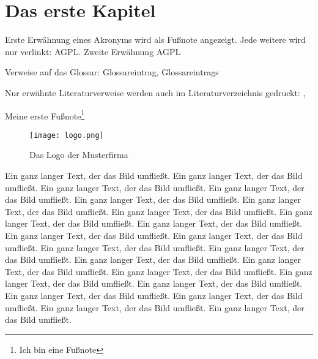 \chapter{Das erste Kapitel}
Erste Erwähnung eines Akronyms wird als Fußnote angezeigt. Jede weitere wird
nur verlinkt: \ac{AGPL}. Zweite Erwähnung \ac{AGPL}

Verweise auf das Glossar: \gls{Glossareintrag}, \glspl{Glossareintrag}

Nur erwähnte Literaturverweise werden auch im Literaturverzeichnis gedruckt:
\cite{baumgartner:2002}, \cite{dreyfus:1980}

Meine erste Fußnote\footnote{Ich bin eine Fußnote}

\begin{wrapfigure}{r}{.4\textwidth}
\texttt{[image: logo.png]}
\vspace{-15pt}
\caption{Das Logo der Musterfirma\footnotemark}
\end{wrapfigure}
Ein ganz langer Text, der das Bild umfließt. Ein ganz langer Text, der das Bild
umfließt. Ein ganz langer Text, der das Bild umfließt. Ein ganz langer Text, der
das Bild umfließt. Ein ganz langer Text, der das Bild umfließt. Ein ganz langer
Text, der das Bild umfließt. Ein ganz langer Text, der das Bild umfließt. Ein
ganz langer Text, der das Bild umfließt. Ein ganz langer Text, der das Bild
umfließt. Ein ganz langer Text, der das Bild umfließt. Ein ganz langer Text, der
das Bild umfließt. Ein ganz langer Text, der das Bild umfließt. Ein ganz langer Text, der das Bild
umfließt. Ein ganz langer Text, der das Bild umfließt. Ein ganz langer Text, der
das Bild umfließt. Ein ganz langer Text, der das Bild umfließt. Ein ganz langer
Text, der das Bild umfließt. Ein ganz langer Text, der das Bild umfließt. Ein
ganz langer Text, der das Bild umfließt. Ein ganz langer Text, der das Bild
umfließt. Ein ganz langer Text, der das Bild umfließt. Ein ganz langer Text, der
das Bild umfließt.
